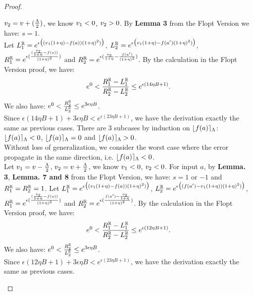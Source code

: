\documentclass[a4paper,11pt]{article}
\begin{document}
\begin{proof}
\begin{itemize}
	$v_2 = v  + (\frac{\Lambda}{2})$,
	we know $v_1 < 0$, $v_2 > 0$.
	By \textbf{Lemma 3} from the Flopt Version we have: $s = 1$.	%
	\\
	Let $L^{\mathbb{R}}_1 = e^{\epsilon 
					\big( (v_1(1 + \eta) - f(a)) (1 + \eta)^2) \big)}$,
	$L^{\mathbb{R}}_2 = e^{\epsilon 
					\big(v_1(1 + \eta) - f(a') (1 + \eta)^2) \big)}$, 
	$R^{\mathbb{R}}_1 = e^{\epsilon 
			(\frac{(\frac{v_2}{1 + \eta} - f(a))}{(1 + \eta)^2})}$
	and $R^{\mathbb{R}}_2 = e^{\epsilon 
			(\frac{v_2}{1 + \eta} - \frac{f(a')}{(1 + \eta)^2})}$.
	By the calculation in the Flopt Version proof, we have:
	\[
		e^0 < \frac{R^{\mathbb{R}}_1 - L^{\mathbb{R}}_1}{R^{\mathbb{R}}_2 - L^{\mathbb{R}}_2}
		\leq e^{\epsilon(14 \eta B + 1)}.
	\]
	We also have:
	$e^0 < \frac{R^{\mathbb{R}}_2}{L^{\mathbb{R}}_2} \leq e^{3 \epsilon \eta B}$.
	\\
	Since $ \epsilon(14 \eta B + 1) + 3 \epsilon \eta B < e^{\epsilon(23 \eta B + 1)}$, 
	we have the derivation exactly the same as previous cases.
	There are 3 subcases by induction on $\lfloor f(a) \rceil_{\Lambda}$:
		$\lfloor f(a) \rceil_{\Lambda} < 0$, $\lfloor f(a) \rceil_{\Lambda} = 0$ and $\lfloor f(a) \rceil_{\Lambda} > 0$. 
		\\
		Without loss of generalization, we consider the worst case where the error propagate in the same direction, i.e. $\lfloor f(a) \rceil_{\Lambda} < 0$.
		\\
		Let $v_1 = v - \frac{\Lambda}{2}$, $v_2 = v + \frac{\Lambda}{2}$, we know $v_1 < 0$, $v_2 < 0$.
		For input $a$, by \textbf{ Lemma. 3}, \textbf{ Lemma. 7 and  8} from the Flopt Version, we have:
		 $s = 1$ or $-1$ and $R^{\mathbb{R}}_1 = R^{\mathbb{R}}_2 = 1$.
	Let $L^{\mathbb{R}}_1 = e^{\epsilon 
					\big( (v_1(1 + \eta) - f(a)) (1 + \eta)^2) \big)}$,
	$L^{\mathbb{R}}_2 = e^{\epsilon 
					\big((f(a') - v_1(1 + \eta)) (1 + \eta)^2) \big)}$, 
	$R^{\mathbb{R}}_1 = e^{\epsilon 
			(\frac{(\frac{v_2}{1 + \eta} - f(a))}{(1 + \eta)^2})}$
	and $R^{\mathbb{R}}_2 = e^{\epsilon 
			(\frac{ f(a') - \frac{v_2}{1 + \eta}}{(1 + \eta)^2})}$.
	By the calculation in the Flopt Version proof, we have:
	\[
		e^0 < \frac{R^{\mathbb{R}}_1 - L^{\mathbb{R}}_1}{R^{\mathbb{R}}_2 - L^{\mathbb{R}}_2}
		\leq e^{\epsilon(12 \eta B + 1)} .
	\]
	We also have:
	$e^0 < \frac{R^{\mathbb{R}}_2}{L^{\mathbb{R}}_2} \leq e^{3\epsilon \eta B}$.
	\\
	Since $ \epsilon(12 \eta B + 1) + 3 \epsilon \eta B < e^{\epsilon(23 \eta B + 1)}$, 
	we have the derivation exactly the same as previous cases.
\end{itemize}


\end{proof}

\newpage


\end{document}
